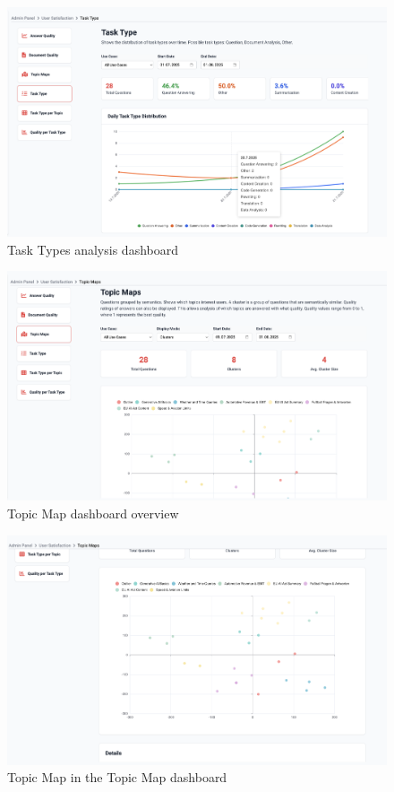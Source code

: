 \documentclass[
	english,
	ruledheaders=section,%
	class=report,%
	thesis={type=bachelor},%
	accentcolor=1b,%
	custommargins=true,%
	marginpar=false,%
	parskip=half-,%
	fontsize=11pt,%
	DIV=14,
]{tudapub}
\begin{document}
\begin{figure}[h!]
    \centering
    \includegraphics[width=0.75\linewidth]{images/TaskTypes.png}
    \captionsetup{list=no}
    \caption{Task Types analysis dashboard}
    \label{fig:task_types}
\end{figure}

\begin{figure}[h!]
    \centering
    \includegraphics[width=0.75\linewidth]{images/TopicMapsOverview.png}
    \captionsetup{list=no}
    \caption{Topic Map dashboard overview}
    \label{fig:topic_maps_overview}
\end{figure}

\begin{figure}[h!]
    \centering
    \includegraphics[width=0.75\linewidth]{images/TopicMapsMap.png}
    \captionsetup{list=no}
    \caption{Topic Map in the Topic Map dashboard}
    \label{fig:topic_maps_maps}
\end{figure}
\end{document}
